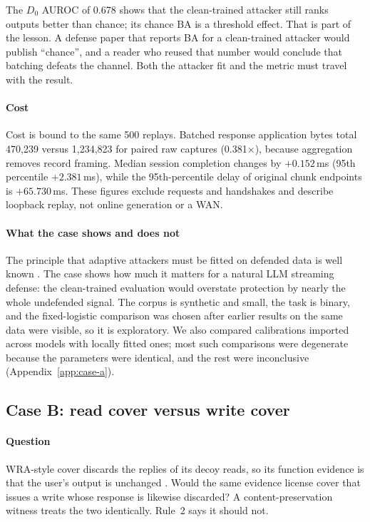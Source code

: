The $D_0$ AUROC of 0.678 shows that the clean-trained attacker still ranks outputs better than chance; its chance BA is a threshold effect. That is part of the lesson. A defense paper that reports BA for a clean-trained attacker would publish ``chance'', and a reader who reused that number would conclude that batching defeats the channel. Both the attacker fit and the metric must travel with the result.

\paragraph{Cost}
Cost is bound to the same 500 replays. Batched response application bytes total 470,239 versus 1,234,823 for paired raw captures (0.381$\times$), because aggregation removes record framing. Median session completion changes by $+0.152$\,ms (95th percentile $+2.381$\,ms), while the 95th-percentile delay of original chunk endpoints is $+65.730$\,ms. These figures exclude requests and handshakes and describe loopback replay, not online generation or a WAN.

\paragraph{What the case shows and does not}
The principle that adaptive attackers must be fitted on defended data is well known \cite{tramer2020adaptive,juarez2014critical}. The case shows how much it matters for a natural LLM streaming defense: the clean-trained evaluation would overstate protection by nearly the whole undefended signal. The corpus is synthetic and small, the task is binary, and the fixed-logistic comparison was chosen after earlier results on the same data were visible, so it is exploratory. We also compared calibrations imported across models with locally fitted ones; most such comparisons were degenerate because the parameters were identical, and the rest were inconclusive (Appendix~\ref{app:case-a}).

\subsection{Case B: read cover versus write cover}\label{sec:case-b}
\paragraph{Question}
WRA-style cover discards the replies of its decoy reads, so its function evidence is that the user's output is unchanged \cite{jeong2026wra}. Would the same evidence license cover that issues a write whose response is likewise discarded? A content-preservation witness treats the two identically. Rule~2 says it should not.

